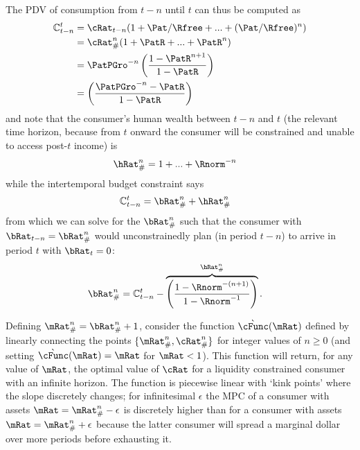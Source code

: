 \documentclass[\econtexRoot/BufferStockTheory]{subfiles}
\begin{document}
The PDV of consumption from $t-n$ until $t$ can thus be computed as
\begin{equation}\begin{gathered}\begin{aligned}
  \mathbb{C}_{t-n}^{t}  & = \cRat_{t-n}(1+\Pat/\Rfree+ ... + (\Pat/\Rfree)^{n})  
  \\  & = \cRat_{\#}^{n}(1+\PatR+ ... + \PatR^{n})  
  \\  & = \PatPGro^{-n}\left(\frac{1-\PatR^{n+1}}{1-\PatR}\right) \label{PDVc}
  \\  & = \left(\frac{\PatPGro^{-n}-\PatR}{1-\PatR}\right) 
\end{aligned}\end{gathered}\end{equation}
and note that the consumer's human wealth between $t-n$ and $t$ (the relevant
time horizon, because from $t$ onward the consumer will be constrained
and unable to access post-$t$ income) is
\begin{equation}\begin{gathered}\begin{aligned}
  \hRat_{\#}^{n}  & = 1+...+\Rnorm^{-n}
\end{aligned}\end{gathered}\end{equation}
while the intertemporal budget constraint says
\begin{eqnarray*}
  \mathbb{C}_{t-n}^{t}  & = \bRat_{\#}^{n}+\hRat_{\#}^{n}
\end{eqnarray*}
from which we can solve for the $\bRat_{\#}^{n}$ such that
the consumer with $\bRat_{t-n} = \bRat_{\#}^{n}$ would
unconstrainedly plan (in period $t-n$) to arrive in period $t$ with
$\bRat_{t}=0$:
\begin{equation}\begin{gathered}\begin{aligned}
  \bRat_{\#}^{n} & =  \mathbb{C}_{t-n}^{t} - \overbrace{\left(\frac{1-\Rnorm^{-(n+1)}}{1-\Rnorm^{-1}}\right)}^{\hRat_{\#}^{n}} \label{eq:bPound}.
\end{aligned}\end{gathered}\end{equation}

Defining $\mRat_{\#}^{n}=\bRat_{\#}^{n}+1$, consider the function
$\grave{\cFunc}(\mRat)$ defined by linearly connecting the points
$\{\mRat_{\#}^{n},\cRat_{\#}^{n}\}$ for integer values of $n \geq 0$
(and setting $\grave{\cFunc}(\mRat)=\mRat$ for $\mRat<1$).  This
function will return, for any value of $\mRat$, the optimal value of
$\cRat$ for a liquidity constrained consumer with an infinite horizon.
The function is piecewise linear with `kink points' where the slope
discretely changes; for infinitesimal $\epsilon$ the MPC of a
consumer with assets $\mRat=\mRat_{\#}^{n}-\epsilon$ is discretely
higher than for a consumer with assets $\mRat=\mRat_{\#}^{n}+\epsilon$
because the latter consumer will spread a marginal dollar over more
periods before exhausting it.
\end{document}
